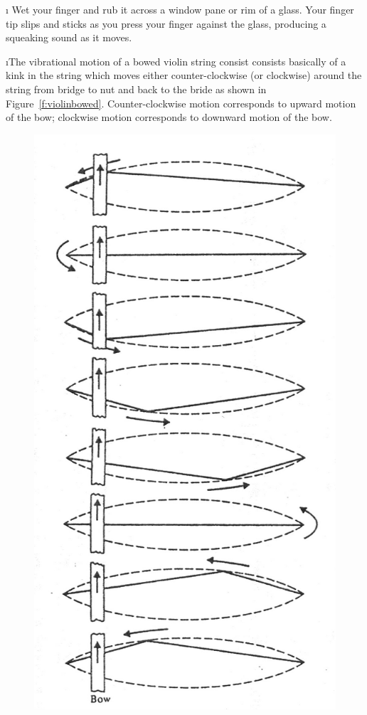 \i \demo 
Wet your finger and rub it across a window pane 
or rim of a glass.
Your finger tip slips and sticks as you press 
your finger against the glass, producing a 
squeaking sound as it moves.

\i The vibrational motion of a bowed violin 
string consist consists basically of a kink in 
the string which moves either counter-clockwise
(or clockwise) around the string from bridge
to nut and back to the bride as shown in 
Figure~\ref{f:violinbowed}.
Counter-clockwise motion corresponds to 
upward motion of the bow; 
clockwise motion corresponds to downward motion
of the bow.
%
\begin{figure}[htbp]
\begin{center}
\includegraphics[height=.8\textheight]{violinbowed.jpg}

\end{center}
\end{figure}
